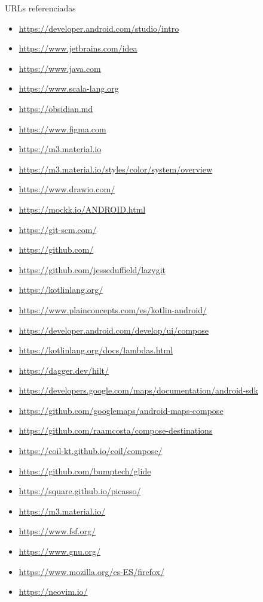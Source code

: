 \newpage
URLs referenciadas
\begin{itemize}
  \item \url{https://developer.android.com/studio/intro}
  \item \url{https://www.jetbrains.com/idea}
  \item \url{https://www.java.com}
  \item \url{https://www.scala-lang.org}
  \item \url{https://obsidian.md}
  \item \url{https://www.figma.com}
  \item \url{https://m3.material.io}
  \item \url{https://m3.material.io/styles/color/system/overview}
  \item \url{https://www.drawio.com/}
  \item \url{https://mockk.io/ANDROID.html}
  \item \url{https://git-scm.com/}
  \item \url{https://github.com/}
  \item \url{https://github.com/jesseduffield/lazygit}
  \item \url{https://kotlinlang.org/}
  \item \url{https://www.plainconcepts.com/es/kotlin-android/}
  \item \url{https://developer.android.com/develop/ui/compose}
  \item \url{https://kotlinlang.org/docs/lambdas.html}
  \item \url{https://dagger.dev/hilt/}
  \item \url{https://developers.google.com/maps/documentation/android-sdk}
  \item \url{https://github.com/googlemaps/android-maps-compose}
  \item \url{https://github.com/raamcosta/compose-destinations}
  \item \url{https://coil-kt.github.io/coil/compose/}
  \item \url{https://github.com/bumptech/glide}
  \item \url{https://square.github.io/picasso/}
  \item \url{https://m3.material.io/}
  \item \url{https://www.fsf.org/}
  \item \url{https://www.gnu.org/}
  \item \url{https://www.mozilla.org/es-ES/firefox/}
  \item \url{https://neovim.io/}

\end{itemize}
